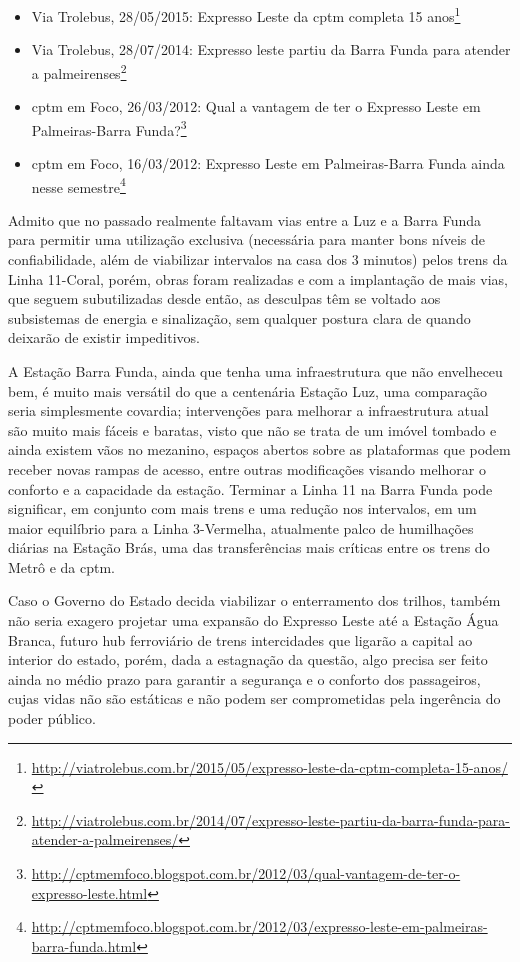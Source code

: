 \documentclass[11pt,fleqn]{book} %
\begin{document}
\begin{itemize}
	\item Via Trolebus, 28/05/2015: Expresso Leste da \gls{cptm} completa 15 anos\footnote{\url{http://viatrolebus.com.br/2015/05/expresso-leste-da-cptm-completa-15-anos/}}
	\item Via Trolebus, 28/07/2014: Expresso leste partiu da Barra Funda para atender a palmeirenses\footnote{\url{http://viatrolebus.com.br/2014/07/expresso-leste-partiu-da-barra-funda-para-atender-a-palmeirenses/}}
	\item \gls{cptm} em Foco, 26/03/2012: Qual a vantagem de ter o Expresso Leste em Palmeiras-Barra Funda?\footnote{\url{http://cptmemfoco.blogspot.com.br/2012/03/qual-vantagem-de-ter-o-expresso-leste.html}}
	\item \gls{cptm} em Foco, 16/03/2012: Expresso Leste em Palmeiras-Barra Funda ainda nesse semestre\footnote{\url{http://cptmemfoco.blogspot.com.br/2012/03/expresso-leste-em-palmeiras-barra-funda.html}}
\end{itemize}

Admito que no passado realmente faltavam vias entre a Luz e a Barra Funda para permitir uma utilização exclusiva (necessária para manter bons níveis de confiabilidade, além de viabilizar intervalos na casa dos 3 minutos) pelos trens da Linha 11-Coral, porém, obras foram realizadas e com a implantação de mais vias, que seguem subutilizadas desde então, as desculpas têm se voltado aos subsistemas de energia e sinalização, sem qualquer postura clara de quando deixarão de existir impeditivos.

A Estação Barra Funda, ainda que tenha uma infraestrutura que não envelheceu bem, é muito mais versátil do que a centenária Estação Luz, uma comparação seria simplesmente covardia; intervenções para melhorar a infraestrutura atual são muito mais fáceis e baratas, visto que não se trata de um imóvel tombado e ainda existem vãos no mezanino, espaços abertos sobre as plataformas que podem receber novas rampas de acesso, entre outras modificações visando melhorar o conforto e a capacidade da estação. Terminar a Linha 11 na Barra Funda pode significar, em conjunto com mais trens e uma redução nos intervalos, em um maior equilíbrio para a Linha 3-Vermelha, atualmente palco de humilhações diárias na Estação Brás, uma das transferências mais críticas entre os trens do Metrô e da \gls{cptm}.

Caso o Governo do Estado decida viabilizar o enterramento dos trilhos, também não seria exagero projetar uma expansão do Expresso Leste até a Estação Água Branca, futuro hub ferroviário de trens intercidades que ligarão a capital ao interior do estado, porém, dada a estagnação da questão, algo precisa ser feito ainda no médio prazo para garantir a segurança e o conforto dos passageiros, cujas vidas não são estáticas e não podem ser comprometidas pela ingerência do poder público.
\end{document}
